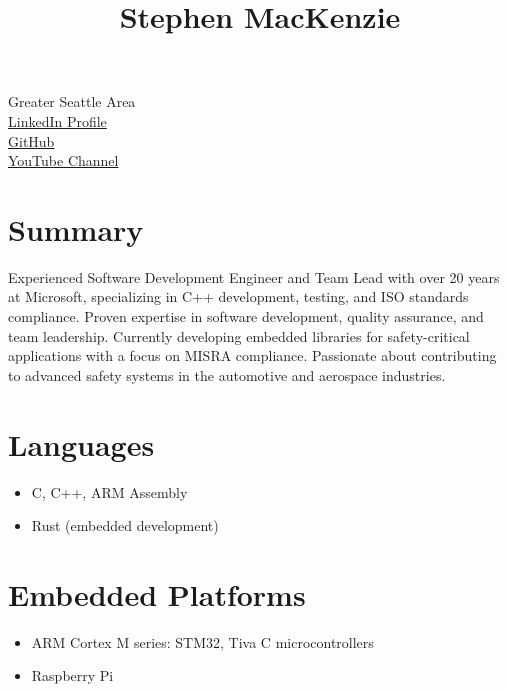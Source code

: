 \documentclass[a4paper,10pt]{article}
\begin{document}
\title{\textbf{Stephen MacKenzie}}  
\author{}
\date{}

\maketitle

\noindent
Greater Seattle Area \\
\href{https://www.linkedin.com/in/stevemac321}{LinkedIn Profile} \\
\href{https://github.com/stevemac321}{GitHub} \\
\href{https://www.youtube.com/channel/UCIM-fR9HF7OgZG8tvvTz6Tg}{YouTube Channel} 

\section*{Summary}
Experienced Software Development Engineer and Team Lead with over 20 years at Microsoft, specializing in C++ development, testing, and ISO standards compliance. Proven expertise in software development, quality assurance, and team leadership. Currently developing embedded libraries for safety-critical applications with a focus on MISRA compliance. Passionate about contributing to advanced safety systems in the automotive and aerospace industries.

\section*{Languages}
\begin{itemize}[leftmargin=1cm]
    \item C, C++, ARM Assembly
    \item Rust (embedded development)
\end{itemize}

\section*{Embedded Platforms}
\begin{itemize}[leftmargin=1cm]
    \item ARM Cortex M series: STM32, Tiva C microcontrollers
    \item Raspberry Pi
\end{itemize}
\end{document}

